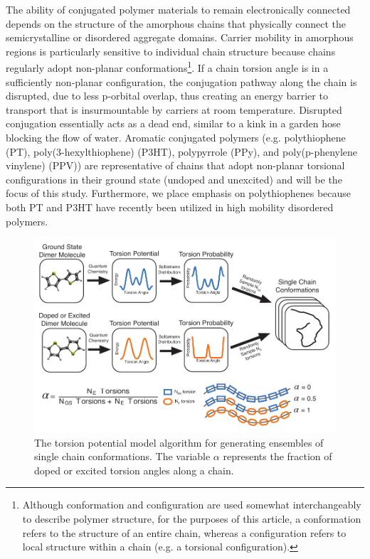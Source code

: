 The ability of conjugated polymer materials to remain electronically connected depends on the structure of the amorphous chains that physically connect the semicrystalline or disordered aggregate domains.\cite{Noriega2013} Carrier mobility in amorphous regions is particularly sensitive to individual chain structure because chains regularly adopt non-planar conformations\footnote[2]{Although conformation and configuration are used somewhat interchangeably to describe polymer structure, for the purposes of this article, a conformation refers to the structure of an entire chain, whereas a configuration refers to local structure within a chain (e.g. a torsional configuration).}.\cite{Noriega2013a} If a chain torsion angle is in a sufficiently non-planar configuration\footnotemark[2], the conjugation pathway along the chain is disrupted, due to less p-orbital overlap, thus creating an energy barrier to transport that is insurmountable by carriers at room temperature. Disrupted conjugation essentially acts as a dead end,\cite{Son2016} similar to a kink in a garden hose blocking the flow of water. Aromatic conjugated polymers (e.g. polythiophene (PT), poly(3-hexylthiophene) (P3HT), polypyrrole (PPy), and poly(p-phenylene vinylene) (PPV)) are representative of chains that adopt non-planar torsional configurations in their ground state (undoped and unexcited) and will be the focus of this study. \cite{Dubay2012, Fonner2010, Kofranek1992, Mao1993} Furthermore, we place emphasis on polythiophenes because both PT and P3HT have recently been utilized in high mobility disordered polymers.\cite{Son2016, Zhang2010}

\begin{figure}[hbt!]
  \includegraphics{figures/chap2/methods_diagram.pdf}
  \caption{The torsion potential model algorithm for generating ensembles of single chain conformations. The variable $\alpha$ represents the fraction of doped or excited torsion angles along a chain.}
  \label{fig:TPM}
\end{figure}

